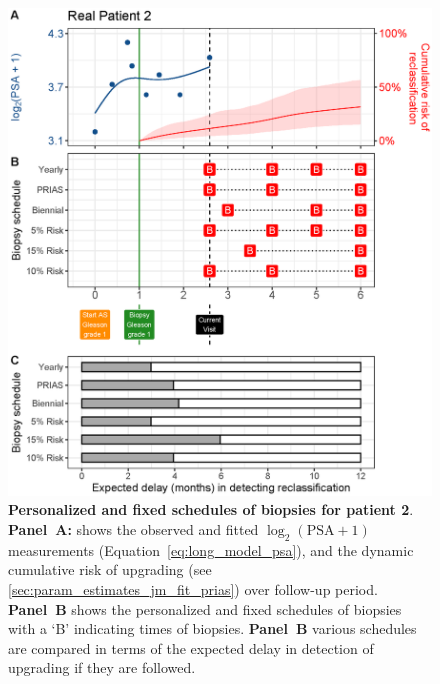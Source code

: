 \begin{figure}
\centerline{\includegraphics[width=\columnwidth]{images/demo_pat2_supp.eps}}
\caption{\textbf{Personalized and fixed schedules of biopsies for patient 2}. \textbf{Panel~A:} shows the observed and fitted $\log_2(\mbox{PSA} + 1)$ measurements (Equation~\ref{eq:long_model_psa}), and the dynamic cumulative risk of upgrading (see \ref{sec:param_estimates_jm_fit_prias}) over follow-up period. \textbf{Panel~B} shows the personalized and fixed schedules of biopsies with a `B' indicating times of biopsies. \textbf{Panel~B} various schedules are compared in terms of the expected delay in detection of upgrading if they are followed.}
\label{fig:demo_pat2_supp}
\end{figure}

